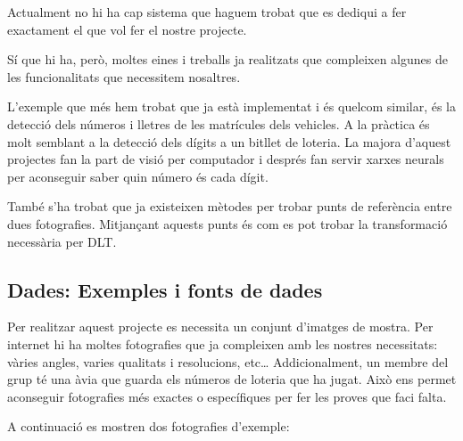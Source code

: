 ﻿\documentclass[10pt,a4paper,twocolumn,twoside]{article}
\begin{document}
Actualment no hi ha cap sistema que haguem trobat que es dediqui a fer exactament el que vol fer el nostre projecte. \par
Sí que hi ha, però, moltes eines i treballs ja realitzats que compleixen algunes de les funcionalitats que necessitem nosaltres. \par
L’exemple que més hem trobat que ja està implementat i és quelcom similar, és la detecció dels números i lletres de les matrícules dels vehicles. A la pràctica és molt semblant a la detecció dels dígits a un bitllet de loteria. La majora d’aquest projectes fan la part de visió per computador i després fan servir xarxes neurals per aconseguir saber quin número és cada dígit. \cite{Sergio_Theodoridis}\par
També s’ha trobat que ja existeixen mètodes per trobar punts de referència entre dues fotografies. Mitjançant aquests punts és com es pot trobar la transformació necessària per DLT. \cite{Sandra_Kief}

\subsection{Dades: Exemples i fonts de dades}

Per realitzar aquest projecte es necessita un conjunt d’imatges de mostra. Per internet hi ha moltes fotografies que ja compleixen amb les nostres necessitats: vàries angles, varies qualitats i resolucions, etc… Addicionalment, un membre del grup té una àvia que guarda els números de loteria que ha jugat. Això ens permet aconseguir fotografies més exactes o específiques per fer les proves que faci falta. \par
A continuació es mostren dos fotografies d’exemple:

\begin{figure}[h]
 \centering
  
 \label{f:Estat de lart}
\end{figure}
\end{document}
